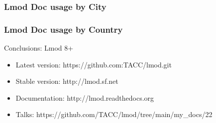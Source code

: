 \documentclass{beamer}
\begin{document}
\begin{frame}[fragile]
    \frametitle{Lmod Doc usage by City}
\end{frame}

\begin{frame}[fragile]
    \frametitle{Lmod Doc usage by Country}
\end{frame}

\begin{frame}{Conclusions: Lmod 8+}
  \begin{itemize}
    \item Latest version: https://github.com:TACC/lmod.git
    \item Stable version: http://lmod.sf.net
    \item Documentation:  http://lmod.readthedocs.org
    \item Talks:          https://github.com/TACC/lmod/tree/main/my\_docs/22
  \end{itemize}
\end{frame}
\end{document}
